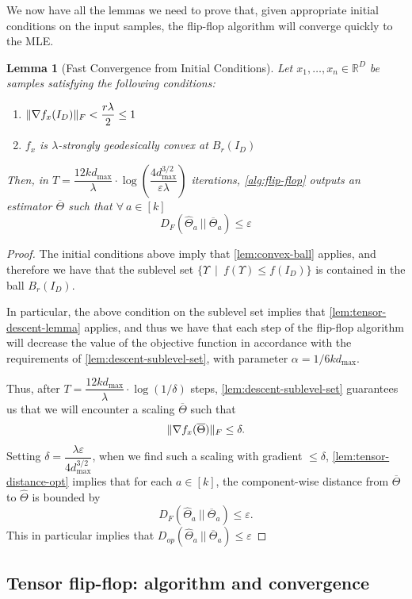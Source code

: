 \documentclass[aos]{imsart}
\newtheorem{lemma}[theorem]{Lemma}
\theoremstyle{definition}
\numberwithin{equation}{section}
\DeclarePairedDelimiter{\norm}{\lVert}{\rVert}
\newcommand{\R}{{\mathbb{R}}}
\newcommand{\otheta}{\overline{\Theta}}
\newcommand{\htheta}{\widehat{\Theta}}
\newcommand{\eps}{\varepsilon}
\def\dmax{d_{\max}}
\begin{document}
We now have all the lemmas we need to prove that, given appropriate initial conditions on the input samples, the flip-flop algorithm will converge quickly to the MLE.

\begin{lemma}[Fast Convergence from Initial Conditions]\label{lem:fast-convergence-initial-generic}
	Let $x_1, \ldots, x_n \in \R^D$ be samples satisfying the following conditions:
	\begin{enumerate}
		\item $\norm{\nabla f_x (I_D)}_F < \dfrac{r \lambda}{2} \leq 1$
		\item $f_x$ is $\lambda$-strongly geodesically convex at $B_r(I_D)$
	\end{enumerate}
	Then, in $T = \dfrac{12k\dmax}{\lambda} \cdot \log\left( \dfrac{4 \dmax^{3/2}}{\eps \lambda} \right)$ iterations, \cref{alg:flip-flop} outputs an estimator $\otheta$ such that $\forall \ a \in [k]$
	$$ D_F(\htheta_a \ || \ \otheta_a) \leq \eps $$
\end{lemma}

\begin{proof}
	The initial conditions above imply that \cref{lem:convex-ball} applies, and therefore we have that the sublevel set $\{ \Upsilon \ \mid \ f(\Upsilon) \leq f(I_D)  \}$ is contained in the ball $B_r(I_D)$. 

	In particular, the above condition on the sublevel set implies that \cref{lem:tensor-descent-lemma} applies, and thus we have that each step of the flip-flop algorithm will decrease the value of the objective function in accordance with the requirements of \cref{lem:descent-sublevel-set}, with parameter $\alpha = 1/6k \dmax$.

	Thus, after $T = \dfrac{12k\dmax}{\lambda} \cdot \log(1/\delta)$ steps, \cref{lem:descent-sublevel-set} guarantees us that we will encounter a scaling $\otheta$ such that
	$$ \norm{\nabla f_x(\otheta)}_F \leq \delta.$$
	Setting $\delta = \dfrac{\lambda \eps}{4 \dmax^{3/2}}$, when we find such a scaling with gradient $\leq \delta$, \cref{lem:tensor-distance-opt} implies that for each $a \in [k]$, the component-wise distance from $\otheta$ to $\htheta$ is bounded by
	$$ D_F(\htheta_a \ || \ \otheta_a) \leq \eps. $$
	This in particular implies that $D_{op}(\htheta_a \ || \ \otheta_a) \leq \eps$
\end{proof}


\subsection{Tensor flip-flop: algorithm and convergence}
\end{document}
